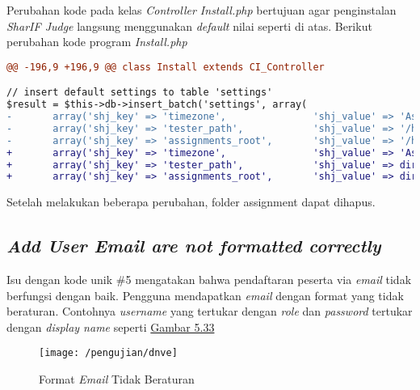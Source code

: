 	Perubahan kode pada kelas \textit{Controller Install.php} bertujuan agar penginstalan \textit{SharIF Judge} langsung menggunakan \textit{default} nilai seperti di atas. Berikut perubahan kode program
	\textit{Install.php}
\begin{lstlisting}[language=diff, basicstyle=\ttfamily, frame=single,
columns=fullflexible, keepspaces=true, breaklines=true]
@@ -196,9 +196,9 @@ class Install extends CI_Controller

// insert default settings to table 'settings'
$result = $this->db->insert_batch('settings', array(
-   	array('shj_key' => 'timezone',               'shj_value' => 'Asia/Tehran'),
-       array('shj_key' => 'tester_path',            'shj_value' => '/home/shj/tester'),
-       array('shj_key' => 'assignments_root',       'shj_value' => '/home/shj/assignments'),
+       array('shj_key' => 'timezone',               'shj_value' => 'Asia/Jakarta'),
+       array('shj_key' => 'tester_path',            'shj_value' => dirname(__FILE__, 3) . "/restricted/tester"),
+       array('shj_key' => 'assignments_root',       'shj_value' => dirname(__FILE__, 3) . "/restricted/assignments"),
\end{lstlisting}
	Setelah melakukan beberapa perubahan, folder assignment dapat dihapus.
	
	\subsection{\textit{Add User Email are not formatted correctly}}
	Isu dengan kode unik \#5 mengatakan bahwa pendaftaran peserta via \textit{email} tidak berfungsi dengan baik. Pengguna mendapatkan \textit{email} dengan format yang tidak beraturan. Contohnya \textit{username} yang tertukar dengan \textit{role} dan \textit{password} tertukar dengan \textit{display name} seperti \hyperref[fig:dnve]{Gambar 5.33} 
	\begin{figure}[H]
		\centering  
		\texttt{[image: /pengujian/dnve]}  
		\caption[Format \textit{Email} Tidak Beraturan]{Format \textit{Email} Tidak Beraturan} 
		\label{fig:dnve} 
	\end{figure}

